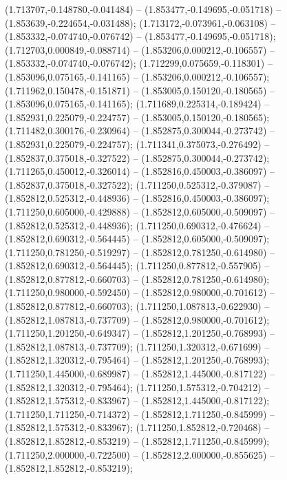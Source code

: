  (1.713707,-0.148780,-0.041484) -- (1.853477,-0.149695,-0.051718) -- (1.853639,-0.224654,-0.031488);
 (1.713172,-0.073961,-0.063108) -- (1.853332,-0.074740,-0.076742) -- (1.853477,-0.149695,-0.051718);
 (1.712703,0.000849,-0.088714) -- (1.853206,0.000212,-0.106557) -- (1.853332,-0.074740,-0.076742);
 (1.712299,0.075659,-0.118301) -- (1.853096,0.075165,-0.141165) -- (1.853206,0.000212,-0.106557);
 (1.711962,0.150478,-0.151871) -- (1.853005,0.150120,-0.180565) -- (1.853096,0.075165,-0.141165);
 (1.711689,0.225314,-0.189424) -- (1.852931,0.225079,-0.224757) -- (1.853005,0.150120,-0.180565);
 (1.711482,0.300176,-0.230964) -- (1.852875,0.300044,-0.273742) -- (1.852931,0.225079,-0.224757);
 (1.711341,0.375073,-0.276492) -- (1.852837,0.375018,-0.327522) -- (1.852875,0.300044,-0.273742);
 (1.711265,0.450012,-0.326014) -- (1.852816,0.450003,-0.386097) -- (1.852837,0.375018,-0.327522);
 (1.711250,0.525312,-0.379087) -- (1.852812,0.525312,-0.448936) -- (1.852816,0.450003,-0.386097);
 (1.711250,0.605000,-0.429888) -- (1.852812,0.605000,-0.509097) -- (1.852812,0.525312,-0.448936);
 (1.711250,0.690312,-0.476624) -- (1.852812,0.690312,-0.564445) -- (1.852812,0.605000,-0.509097);
 (1.711250,0.781250,-0.519297) -- (1.852812,0.781250,-0.614980) -- (1.852812,0.690312,-0.564445);
 (1.711250,0.877812,-0.557905) -- (1.852812,0.877812,-0.660703) -- (1.852812,0.781250,-0.614980);
 (1.711250,0.980000,-0.592450) -- (1.852812,0.980000,-0.701612) -- (1.852812,0.877812,-0.660703);
 (1.711250,1.087813,-0.622930) -- (1.852812,1.087813,-0.737709) -- (1.852812,0.980000,-0.701612);
 (1.711250,1.201250,-0.649347) -- (1.852812,1.201250,-0.768993) -- (1.852812,1.087813,-0.737709);
 (1.711250,1.320312,-0.671699) -- (1.852812,1.320312,-0.795464) -- (1.852812,1.201250,-0.768993);
 (1.711250,1.445000,-0.689987) -- (1.852812,1.445000,-0.817122) -- (1.852812,1.320312,-0.795464);
 (1.711250,1.575312,-0.704212) -- (1.852812,1.575312,-0.833967) -- (1.852812,1.445000,-0.817122);
 (1.711250,1.711250,-0.714372) -- (1.852812,1.711250,-0.845999) -- (1.852812,1.575312,-0.833967);
 (1.711250,1.852812,-0.720468) -- (1.852812,1.852812,-0.853219) -- (1.852812,1.711250,-0.845999);
 (1.711250,2.000000,-0.722500) -- (1.852812,2.000000,-0.855625) -- (1.852812,1.852812,-0.853219);
